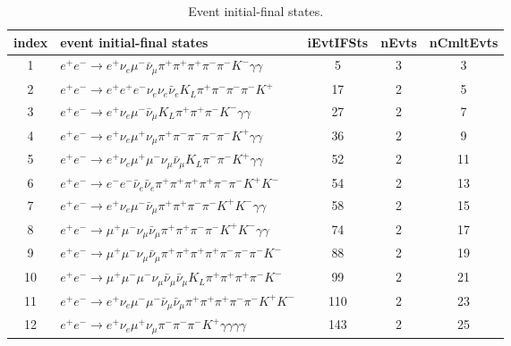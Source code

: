 \documentclass[landscape]{article}
\begin{document}
\begin{table}[htbp!]
\caption{Event initial-final states.}
\small
\centering
\begin{tabular}{|c|>{\centering}p{18cm}|c|c|c|}
\hline
index & event initial-final states & iEvtIFSts & nEvts & nCmltEvts \\
\hline
1 & $ e^{+} e^{-} \rightarrow e^{+} \nu_{e} \mu^{-} \bar{\nu}_{\mu} \pi^{+} \pi^{+} \pi^{+} \pi^{-} \pi^{-} K^{-} \gamma \gamma $ & 5 & 3 & 3 \\
\hline
2 & $ e^{+} e^{-} \rightarrow e^{+} e^{+} e^{-} \nu_{e} \nu_{e} \bar{\nu}_{e} K_{L} \pi^{+} \pi^{-} \pi^{-} \pi^{-} K^{+} $ & 17 & 2 & 5 \\
\hline
3 & $ e^{+} e^{-} \rightarrow e^{+} \nu_{e} \mu^{-} \bar{\nu}_{\mu} K_{L} \pi^{+} \pi^{+} \pi^{-} K^{-} \gamma \gamma $ & 27 & 2 & 7 \\
\hline
4 & $ e^{+} e^{-} \rightarrow e^{+} \nu_{e} \mu^{+} \nu_{\mu} \pi^{+} \pi^{-} \pi^{-} \pi^{-} \pi^{-} K^{+} \gamma \gamma $ & 36 & 2 & 9 \\
\hline
5 & $ e^{+} e^{-} \rightarrow e^{+} \nu_{e} \mu^{+} \mu^{-} \nu_{\mu} \bar{\nu}_{\mu} K_{L} \pi^{-} \pi^{-} K^{+} \gamma \gamma $ & 52 & 2 & 11 \\
\hline
6 & $ e^{+} e^{-} \rightarrow e^{-} e^{-} \bar{\nu}_{e} \bar{\nu}_{e} \pi^{+} \pi^{+} \pi^{+} \pi^{+} \pi^{-} \pi^{-} K^{+} K^{-} $ & 54 & 2 & 13 \\
\hline
7 & $ e^{+} e^{-} \rightarrow e^{+} \nu_{e} \mu^{-} \bar{\nu}_{\mu} \pi^{+} \pi^{+} \pi^{-} \pi^{-} K^{+} K^{-} \gamma \gamma $ & 58 & 2 & 15 \\
\hline
8 & $ e^{+} e^{-} \rightarrow \mu^{+} \mu^{-} \nu_{\mu} \bar{\nu}_{\mu} \pi^{+} \pi^{+} \pi^{-} \pi^{-} K^{+} K^{-} \gamma \gamma $ & 74 & 2 & 17 \\
\hline
9 & $ e^{+} e^{-} \rightarrow \mu^{+} \mu^{-} \nu_{\mu} \bar{\nu}_{\mu} \pi^{+} \pi^{+} \pi^{+} \pi^{+} \pi^{-} \pi^{-} \pi^{-} K^{-} $ & 88 & 2 & 19 \\
\hline
10 & $ e^{+} e^{-} \rightarrow \mu^{+} \mu^{-} \mu^{-} \nu_{\mu} \bar{\nu}_{\mu} \bar{\nu}_{\mu} K_{L} \pi^{+} \pi^{+} \pi^{+} \pi^{-} K^{-} $ & 99 & 2 & 21 \\
\hline
11 & $ e^{+} e^{-} \rightarrow e^{+} \nu_{e} \mu^{-} \mu^{-} \bar{\nu}_{\mu} \bar{\nu}_{\mu} \pi^{+} \pi^{+} \pi^{+} \pi^{-} \pi^{-} K^{+} K^{-} $ & 110 & 2 & 23 \\
\hline
12 & $ e^{+} e^{-} \rightarrow e^{+} \nu_{e} \mu^{+} \nu_{\mu} \pi^{-} \pi^{-} \pi^{-} K^{+} \gamma \gamma \gamma \gamma $ & 143 & 2 & 25 \\

\end{tabular}
\end{table}
\end{document}
